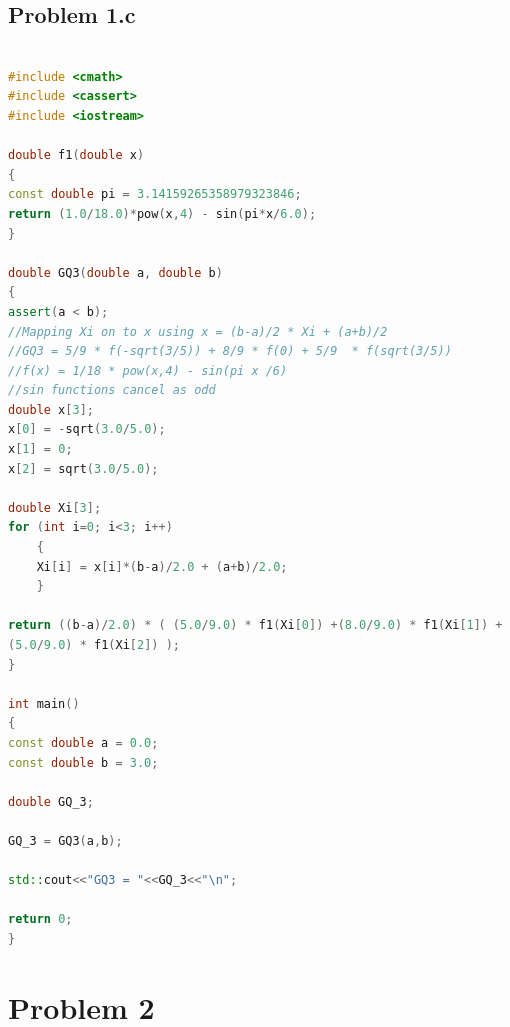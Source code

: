 \documentclass[a4paper,12pt,onecolumn,final]{article}
\begin{document}
\subsection*{Problem 1.c}
\begin{lstlisting}[language=C++]

#include <cmath>
#include <cassert>
#include <iostream>

double f1(double x)
{
const double pi = 3.14159265358979323846;
return (1.0/18.0)*pow(x,4) - sin(pi*x/6.0);
}

double GQ3(double a, double b)
{
assert(a < b);
//Mapping Xi on to x using x = (b-a)/2 * Xi + (a+b)/2
//GQ3 = 5/9 * f(-sqrt(3/5)) + 8/9 * f(0) + 5/9  * f(sqrt(3/5))
//f(x) = 1/18 * pow(x,4) - sin(pi x /6)
//sin functions cancel as odd
double x[3];
x[0] = -sqrt(3.0/5.0);
x[1] = 0;
x[2] = sqrt(3.0/5.0);

double Xi[3];
for (int i=0; i<3; i++)
    {
    Xi[i] = x[i]*(b-a)/2.0 + (a+b)/2.0;
    }

return ((b-a)/2.0) * ( (5.0/9.0) * f1(Xi[0]) +(8.0/9.0) * f1(Xi[1]) + 
(5.0/9.0) * f1(Xi[2]) );
}

int main()
{
const double a = 0.0;
const double b = 3.0;

double GQ_3;

GQ_3 = GQ3(a,b);

std::cout<<"GQ3 = "<<GQ_3<<"\n";

return 0;
}

\end{lstlisting}%

\section*{Problem 2}
\end{document}
